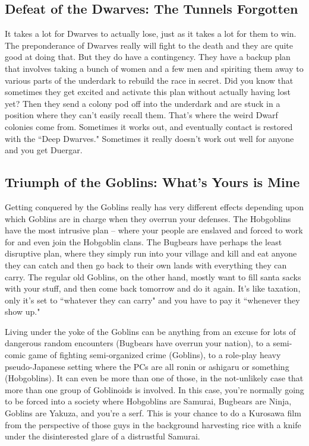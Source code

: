 \subsection{Defeat of the Dwarves: The Tunnels Forgotten}

It takes a lot for Dwarves to actually lose, just as it takes a lot for them to win. The preponderance of Dwarves really will fight to the death and they are quite good at doing that. But they do have a contingency. They have a backup plan that involves taking a bunch of women and a few men and spiriting them away to various parts of the underdark to rebuild the race in secret. Did you know that sometimes they get excited and activate this plan without actually having lost yet? Then they send a colony pod off into the underdark and are stuck in a position where they can't easily recall them. That's where the weird Dwarf colonies come from. Sometimes it works out, and eventually contact is restored with the ``Deep Dwarves." Sometimes it really doesn't work out well for anyone and you get Duergar.

\subsection{Triumph of the Goblins: What's Yours is Mine}

Getting conquered by the Goblins really has very different effects depending upon which Goblins are in charge when they overrun your defenses. The Hobgoblins have the most intrusive plan -- where your people are enslaved and forced to work for and even join the Hobgoblin clans. The Bugbears have perhaps the least disruptive plan, where they simply run into your village and kill and eat anyone they can catch and then go back to their own lands with everything they can carry. The regular old Goblins, on the other hand, mostly want to fill santa sacks with your stuff, and then come back tomorrow and do it again. It's like taxation, only it's set to ``whatever they can carry" and you have to pay it ``whenever they show up."

Living under the yoke of the Goblins can be anything from an excuse for lots of dangerous random encounters (Bugbears have overrun your nation), to a semi-comic game of fighting semi-organized crime (Goblins), to a role-play heavy pseudo-Japanese setting where the PCs are all ronin or ashigaru or something (Hobgoblins). It can even be more than one of those, in the not-unlikely case that more than one group of Goblinoids is involved. In this case, you're normally going to be forced into a society where Hobgoblins are Samurai, Bugbears are Ninja, Goblins are Yakuza, and you're a serf. This is your chance to do a Kurosawa film from the perspective of those guys in the background harvesting rice with a knife under the disinterested glare of a distrustful Samurai.

